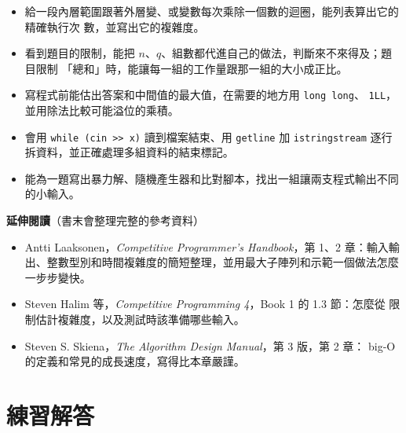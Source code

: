 \begin{itemize}
\item 給一段內層範圍跟著外層變、或變數每次乘除一個數的迴圈，能列表算出它的精確執行次
數，並寫出它的複雜度。
\item 看到題目的限制，能把 $n$、$q$、組數都代進自己的做法，判斷來不來得及；題目限制
「總和」時，能讓每一組的工作量跟那一組的大小成正比。
\item 寫程式前能估出答案和中間值的最大值，在需要的地方用 \texttt{long long}、
\texttt{1LL}，並用除法比較可能溢位的乘積。
\item 會用 \texttt{while (cin >> x)} 讀到檔案結束、用 \texttt{getline} 加
\texttt{istringstream} 逐行拆資料，並正確處理多組資料的結束標記。
\item 能為一題寫出暴力解、隨機產生器和比對腳本，找出一組讓兩支程式輸出不同的小輸入。
\end{itemize}

\textbf{延伸閱讀}（書末會整理完整的參考資料）

\begin{itemize}
\item Antti Laaksonen，\textit{Competitive Programmer's Handbook}，第 1、2 章：輸入輸
出、整數型別和時間複雜度的簡短整理，並用最大子陣列和示範一個做法怎麼一步步變快。
\item Steven Halim 等，\textit{Competitive Programming 4}，Book 1 的 1.3 節：怎麼從
限制估計複雜度，以及測試時該準備哪些輸入。
\item Steven S. Skiena，\textit{The Algorithm Design Manual}，第 3 版，第 2 章：
big-O 的定義和常見的成長速度，寫得比本章嚴謹。
\end{itemize}

\section*{練習解答}

